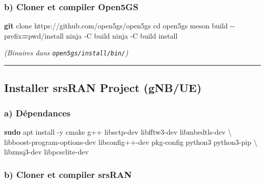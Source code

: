 \documentclass[
]{article}
\newenvironment{Shaded}{\begin{snugshade}}{\end{snugshade}}
\newcommand{\AttributeTok}[1]{\textcolor[rgb]{0.13,0.29,0.53}{#1}}
\newcommand{\BuiltInTok}[1]{#1}
\newcommand{\DataTypeTok}[1]{\textcolor[rgb]{0.13,0.29,0.53}{#1}}
\newcommand{\ExtensionTok}[1]{#1}
\newcommand{\FunctionTok}[1]{\textcolor[rgb]{0.13,0.29,0.53}{\textbf{#1}}}
\newcommand{\KeywordTok}[1]{\textcolor[rgb]{0.13,0.29,0.53}{\textbf{#1}}}
\newcommand{\NormalTok}[1]{#1}
\newcommand{\OperatorTok}[1]{\textcolor[rgb]{0.81,0.36,0.00}{\textbf{#1}}}
\begin{document}
\subsubsection{b) Cloner et compiler
Open5GS}\label{b-cloner-et-compiler-open5gs}

\begin{Shaded}
\begin{Highlighting}[]
\FunctionTok{git}\NormalTok{ clone https://github.com/open5gs/open5gs}
\BuiltInTok{cd}\NormalTok{ open5gs}
\ExtensionTok{meson}\NormalTok{ build }\AttributeTok{{-}{-}prefix}\OperatorTok{=}\KeywordTok{\textasciigrave{}}\BuiltInTok{pwd}\KeywordTok{\textasciigrave{}}\NormalTok{/install}
\ExtensionTok{ninja} \AttributeTok{{-}C}\NormalTok{ build}
\ExtensionTok{ninja} \AttributeTok{{-}C}\NormalTok{ build install}
\end{Highlighting}
\end{Shaded}

\emph{(Binaires dans \texttt{open5gs/install/bin/})}

\begin{center}\rule{0.5\linewidth}{0.5pt}\end{center}

\subsection{Installer srsRAN Project
(gNB/UE)}\label{installer-srsran-project-gnbue}

\subsubsection{a) Dépendances}\label{a-duxe9pendances-1}

\begin{Shaded}
\begin{Highlighting}[]
\FunctionTok{sudo}\NormalTok{ apt install }\AttributeTok{{-}y}\NormalTok{ cmake g++ libsctp{-}dev libfftw3{-}dev libmbedtls{-}dev }\DataTypeTok{\textbackslash{}}
\NormalTok{  libboost{-}program{-}options{-}dev libconfig++{-}dev pkg{-}config python3 python3{-}pip }\DataTypeTok{\textbackslash{}}
\NormalTok{  libzmq3{-}dev libpcsclite{-}dev}
\end{Highlighting}
\end{Shaded}

\subsubsection{b) Cloner et compiler
srsRAN}\label{b-cloner-et-compiler-srsran}
\end{document}
